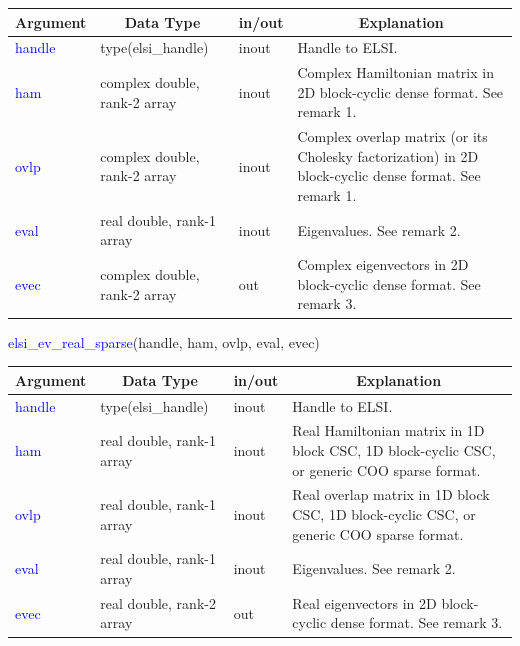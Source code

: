 \documentclass{report}
\newcommand{\tcb}[1]{\textcolor{blue}{#1}}
\begin{document}
\begin{tabular}[]{|p{20mm}|p{45mm}|p{15mm}|p{85mm}|}
\hline
\multicolumn{1}{|c|}{\textbf{Argument}} & \multicolumn{1}{c|}{\textbf{Data Type}} & \multicolumn{1}{c|}{\textbf{in/out}} & \multicolumn{1}{c|}{\textbf{Explanation}}\\
\hline
\tcb{handle} & type(elsi\_handle)           & inout & Handle to ELSI.\\
\hline
\tcb{ham}    & complex double, rank-2 array & inout & Complex Hamiltonian matrix in 2D block-cyclic dense format. See remark 1.\\
\hline
\tcb{ovlp}   & complex double, rank-2 array & inout & Complex overlap matrix (or its Cholesky factorization) in 2D block-cyclic dense format. See remark 1.\\
\hline
\tcb{eval}   & real double, rank-1 array    & inout & Eigenvalues. See remark 2.\\
\hline
\tcb{evec}   & complex double, rank-2 array & out   & Complex eigenvectors in 2D block-cyclic dense format. See remark 3.\\
\hline
\end{tabular}

\begin{labeling}{\hspace{6cm}}
\item [\hspace{0.3cm} \tcb{elsi\_ev\_real\_sparse}(handle, ham, ovlp, eval, evec)]
\end{labeling}

\begin{table}[h]
\centering
\begin{tabular}[]{|p{20mm}|p{45mm}|p{15mm}|p{85mm}|}
\hline
\multicolumn{1}{|c|}{\textbf{Argument}} & \multicolumn{1}{c|}{\textbf{Data Type}} & \multicolumn{1}{c|}{\textbf{in/out}} & \multicolumn{1}{c|}{\textbf{Explanation}}\\
\hline
\tcb{handle} & type(elsi\_handle)        & inout & Handle to ELSI.\\
\hline
\tcb{ham}    & real double, rank-1 array & inout & Real Hamiltonian matrix in 1D block CSC, 1D block-cyclic CSC, or generic COO sparse format.\\
\hline
\tcb{ovlp}   & real double, rank-1 array & inout & Real overlap matrix in 1D block CSC, 1D block-cyclic CSC, or generic COO sparse format.\\
\hline
\tcb{eval}   & real double, rank-1 array & inout & Eigenvalues. See remark 2.\\
\hline
\tcb{evec}   & real double, rank-2 array & out   & Real eigenvectors in 2D block-cyclic dense format. See remark 3.\\
\hline
\end{tabular}
\end{table}
\end{document}
